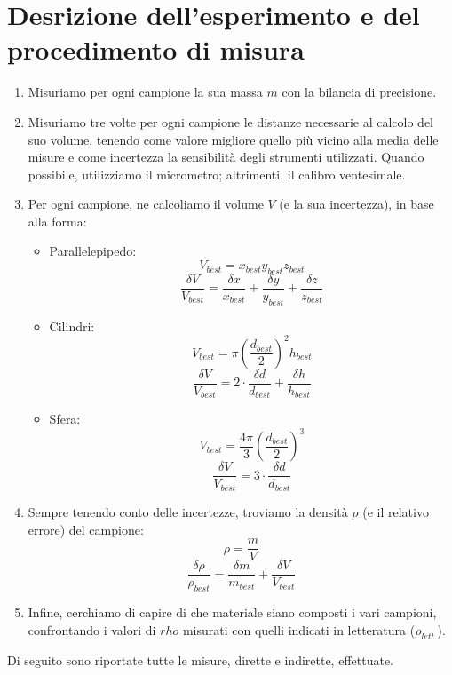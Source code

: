\documentclass{article}
\begin{document}
\section{Desrizione dell'esperimento e del procedimento di misura}
\begin{enumerate}
    \item Misuriamo per ogni campione la sua massa $m$ con la bilancia di precisione.
    \item Misuriamo tre volte per ogni campione le distanze necessarie al calcolo
          del suo volume, tenendo come valore migliore quello più vicino alla media
          delle misure e come incertezza la sensibilità degli strumenti utilizzati.
          Quando possibile, utilizziamo il micrometro; altrimenti, il calibro ventesimale.
    \item Per ogni campione, ne calcoliamo il volume $V$ (e la sua incertezza), in base alla forma:
    \begin{itemize}
        \item Parallelepipedo:
            \[V_{best} = x_{best} y_{best} z_{best}\]
            \[
                \frac{\delta V}{V_{best}} = \frac{\delta x}{x_{best}} + \frac{\delta y}{y_{best}} + \frac{\delta z}{z_{best}}
            \]
        \item Cilindri:
            \[V_{best} = \pi \left(\frac{d_{best}}{2}\right)^2 h_{best}\]
            \[
                \frac{\delta V}{V_{best}} = 2 \cdot \frac{\delta d}{d_{best}} + \frac{\delta h}{h_{best}}
            \]
        \item Sfera:
            \[V_{best} = \frac{4 \pi}{3} \left(\frac{d_{best}}{2}\right)^3\]
            \[
                \frac{\delta V}{V_{best}} = 3 \cdot \frac{\delta d}{d_{best}}
            \]
    \end{itemize}
    \item Sempre tenendo conto delle incertezze, troviamo la densità $\rho$ (e il relativo errore) del campione:
        \[\rho = \frac{m}{V}\]
        \[\frac{\delta \rho}{\rho_{best}} = \frac{\delta m}{m_{best}} + \frac{\delta V}{V_{best}}\]
    \item Infine, cerchiamo di capire di che materiale siano composti i vari campioni, confrontando
    i valori di $rho$ misurati con quelli indicati in letteratura ($\rho_{lett.}$).
\end{enumerate}

Di seguito sono riportate tutte le misure, dirette e indirette, effettuate.
\end{document}
